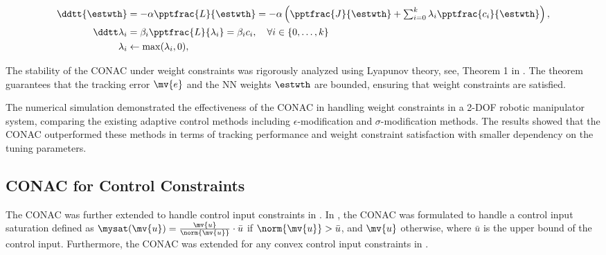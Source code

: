 \documentclass[conference]{IEEEtran}
\begin{document}
\begin{subequations}
    \begin{align}
            \ddtt{\estwth}
            &
            =
            -\alpha \pptfrac{L}{\estwth}
            =
            -\alpha 
            \left(
                \pptfrac{J}{\estwth}
                +
                \textstyle\sum_{i=0}^k
                \lambda_i
                \pptfrac{c_i}{\estwth}
            \right),
        \label{eq:adap:th}
            \\
            \ddtt\lambda_i
            & 
            = 
            \beta_i\pptfrac{L}{\lambda_i} 
            = 
            \beta_i c_i ,
            \quad \forall i\in\{0,\ldots,k\}
        \label{eq:adap:lbd}
            \\
            \lambda_i & \leftarrow \max(\lambda_i,0) ,
        \label{eq:adap:lbd:max}
    \end{align}
    \label{eq:adaptation law}%
\end{subequations}

The stability of the CONAC under weight constraints was rigorously analyzed using Lyapunov theory, \ie see, Theorem 1 in \cite{Ryu:2024aa}.
The theorem guarantees that the tracking error $\mv{e}$ and the NN weights $\estwth$ are bounded, ensuring that weight constraints are satisfied.

The numerical simulation demonstrated the effectiveness of the CONAC in handling weight constraints in a 2-DOF robotic manipulator system, comparing the existing adaptive control methods including $\epsilon$-modification and $\sigma$-modification methods.
The results showed that the CONAC outperformed these methods in terms of tracking performance and weight constraint satisfaction with smaller dependency on the tuning parameters.

\subsection{CONAC for Control Constraints}

The CONAC was further extended to handle control input constraints in \cite{Ryu:2024ab,Ryu:2025aa}.
In \cite{Ryu:2024ab}, the CONAC was formulated to handle a control input saturation defined as $\mysat(\mv{u})=\tfrac{\mv{u}}{\norm{\mv{u}}}\cdot\bar{u}$ if $\norm{\mv{u}}>\bar{u}$, and $\mv{u}$ otherwise, where $\bar{u}$ is the upper bound of the control input.
Furthermore, the CONAC was extended for any convex control input constraints in \cite{Ryu:2025aa}.
\end{document}
